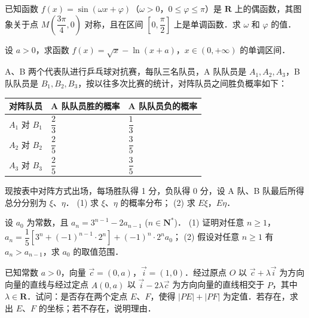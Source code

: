 \begin{question}
已知函数 $f(x) = \sin(\omega x + \varphi)$（$\omega > 0$，$0 \le \varphi \le \pi$）是 $\mathbf{R}$ 上的偶函数，其图象关于点 $M\left(\dfrac{3\pi}{4}, 0\right)$ 对称，且在区间 $\left[0, \dfrac{\pi}{2}\right]$ 上是单调函数．求 $\omega$ 和 $\varphi$ 的值．

\end{question}
\begin{question}
设 $a > 0$，求函数 $f(x) = \sqrt{x} - \ln(x + a)$，$x \in (0, +\infty)$ 的单调区间．

\end{question}
\begin{question}
A、B 两个代表队进行乒乓球对抗赛，每队三名队员，A 队队员是 $A_1, A_2, A_3$，B 队队员是 $B_1, B_2, B_3$，按以往多次比赛的统计，对阵队员之间胜负概率如下：

\begin{center}
\begin{tabular}{lll}
\toprule
对阵队员 & A 队队员胜的概率 & A 队队员负的概率 \\
\midrule
$A_1$ 对 $B_1$ & $\dfrac{2}{3}$ & $\dfrac{1}{3}$ \\
$A_2$ 对 $B_2$ & $\dfrac{2}{5}$ & $\dfrac{3}{5}$ \\
$A_3$ 对 $B_3$ & $\dfrac{2}{5}$ & $\dfrac{3}{5}$ \\
\bottomrule
\end{tabular}
\end{center}

现按表中对阵方式出场，每场胜队得 1 分，负队得 0 分，设 A 队、B 队最后所得总分分别为 $\xi$、$\eta$．
(1) 求 $\xi$、$\eta$ 的概率分布；
(2) 求 $E\xi$，$E\eta$．

\end{question}
\begin{question}
设 $a_0$ 为常数，且 $a_n = 3^{n-1} - 2a_{n-1}$ ($n \in \mathbf{N}^*$)．
(1) 证明对任意 $n \ge 1$，$a_n = \dfrac{1}{5}[3^n + (-1)^{n-1} \cdot 2^n] + (-1)^n \cdot 2^n a_0$；
(2) 假设对任意 $n \ge 1$ 有 $a_n > a_{n-1}$，求 $a_0$ 的取值范围．

\end{question}
\begin{question}
已知常数 $a > 0$，向量 $\vec{c} = (0, a)$，$\vec{i} = (1, 0)$．经过原点 $O$ 以 $\vec{c} + \lambda\vec{i}$ 为方向向量的直线与经过定点 $A(0, a)$ 以 $\vec{i} - 2\lambda\vec{c}$ 为方向向量的直线相交于 $P$，其中 $\lambda \in \mathbf{R}$．试问：是否存在两个定点 $E$、$F$，使得 $|PE| + |PF|$ 为定值．若存在，求出 $E$、$F$ 的坐标；若不存在，说明理由．

\end{question}